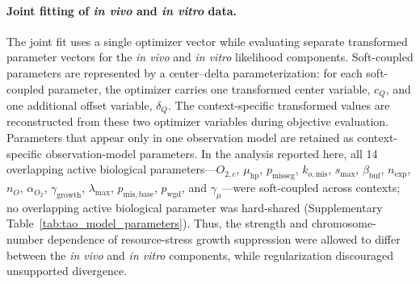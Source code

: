 \documentclass[11pt]{article}
\begin{document}
\paragraph{Joint fitting of \textit{in vivo} and \textit{in vitro} data.}
The joint fit uses a single optimizer vector while evaluating separate transformed parameter vectors for the \textit{in vivo} and \textit{in vitro} likelihood components. Soft-coupled parameters are represented by a center--delta parameterization: for each soft-coupled parameter, the optimizer carries one transformed center variable, $c_Q$, and one additional offset variable, $\delta_Q$. The context-specific transformed values are reconstructed from these two optimizer variables during objective evaluation.
Parameters that appear only in one observation model are retained as context-specific observation-model parameters. In the analysis reported here, all 14 overlapping active biological parameters---$O_{2,c}$, $\mu_{\mathrm{hp}}$, $p_{\mathrm{misseg}}$, $k_{o,\mathrm{mis}}$, $s_{\max}$, $\beta_{\mathrm{buf}}$, $n_{\mathrm{exp}}$, $n_O$, $\alpha_{O_2}$, $\gamma_{\mathrm{growth}}$, $\lambda_{\max}$, $p_{\mathrm{mis,base}}$, $p_{\mathrm{wgd}}$, and $\gamma_\mu$---were soft-coupled across contexts; no overlapping active biological parameter was hard-shared (Supplementary Table~\ref{tab:tao_model_parameters}). Thus, the strength and chromosome-number dependence of resource-stress growth suppression were allowed to differ between the \textit{in vivo} and \textit{in vitro} components, while regularization discouraged unsupported divergence.
\end{document}
